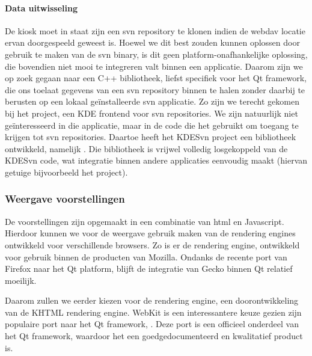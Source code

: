 \paragraph{Data uitwisseling} De kiosk moet in staat zijn een \ac{svn} repository te klonen indien de \ac{webdav} locatie ervan doorgespeeld geweest is. Hoewel we dit best zouden kunnen oplossen door gebruik te maken van de \ac{svn} binary, is dit geen platform-onafhankelijke oplossing, die bovendien niet mooi te integreren valt binnen een applicatie. Daarom zijn we op zoek gegaan naar een C++ bibliotheek, liefst specifiek voor het Qt framework, die ons toelaat gegevens van een \ac{svn} repository binnen te halen zonder daarbij te berusten op een lokaal geïnstalleerde \ac{svn} applicatie. Zo zijn we terecht gekomen bij het  project, een KDE frontend voor \ac{svn} repositories. We zijn natuurlijk niet geïnteresseerd in die applicatie, maar in de code die het gebruikt om toegang te krijgen tot \ac{svn} repositories. Daartoe heeft het KDESvn project een bibliotheek ontwikkeld, namelijk . Die bibliotheek is vrijwel volledig losgekoppeld van de KDESvn code, wat integratie binnen andere applicaties eenvoudig maakt (hiervan getuige bijvoorbeeld het  project).

\subsubsection{Weergave voorstellingen}

De voorstellingen zijn opgemaakt in een combinatie van \ac{html} en Javascript. Hierdoor kunnen we voor de weergave gebruik maken van de rendering engines ontwikkeld voor verschillende browsers. Zo is er de  rendering engine, ontwikkeld voor gebruik binnen de producten van Mozilla. Ondanks de recente port van Firefox naar het Qt platform, blijft de integratie van Gecko binnen Qt relatief moeilijk.

Daarom zullen we eerder kiezen voor de  rendering engine, een doorontwikkeling van de KHTML rendering engine. WebKit is een interessantere keuze gezien zijn populaire port naar het Qt framework, . Deze port is een officieel onderdeel van het Qt framework, waardoor het een goedgedocumenteerd en kwalitatief product is.

